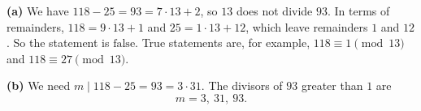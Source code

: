 \textbf{(a)} We have $118-25=93=7\cdot13+2$, so $13$ does not divide $93$. In terms of remainders, $118=9\cdot13+1$ and $25=1\cdot13+12$, which leave remainders $1$ and $12$. So the statement is $\boxed{\text{false}}$. True statements are, for example, $118\equiv1\pmod{13}$ and $118\equiv27\pmod{13}$.

\textbf{(b)} We need $m\mid118-25=93=3\cdot31$. The divisors of $93$ greater than $1$ are
\[
\boxed{m=3,\ 31,\ 93}.
\]
